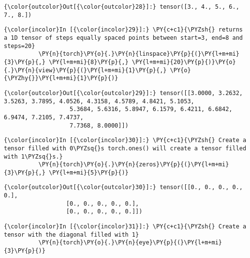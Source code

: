 \begin{Verbatim}[commandchars=\\\{\}]
{\color{outcolor}Out[{\color{outcolor}28}]:} tensor([3., 4., 5., 6., 7., 8.])
\end{Verbatim}
            
\begin{Verbatim}[commandchars=\\\{\}]
{\color{incolor}In [{\color{incolor}29}]:} \PY{c+c1}{\PYZsh{} returns a 1D tensor of steps equally spaced points between start=3, end=8 and steps=20}
          \PY{n}{torch}\PY{o}{.}\PY{n}{linspace}\PY{p}{(}\PY{l+m+mi}{3}\PY{p}{,} \PY{l+m+mi}{8}\PY{p}{,} \PY{l+m+mi}{20}\PY{p}{)}\PY{o}{.}\PY{n}{view}\PY{p}{(}\PY{l+m+mi}{1}\PY{p}{,} \PY{o}{\PYZhy{}}\PY{l+m+mi}{1}\PY{p}{)} 
\end{Verbatim}


\begin{Verbatim}[commandchars=\\\{\}]
{\color{outcolor}Out[{\color{outcolor}29}]:} tensor([[3.0000, 3.2632, 3.5263, 3.7895, 4.0526, 4.3158, 4.5789, 4.8421, 5.1053,
                   5.3684, 5.6316, 5.8947, 6.1579, 6.4211, 6.6842, 6.9474, 7.2105, 7.4737,
                   7.7368, 8.0000]])
\end{Verbatim}
            
\begin{Verbatim}[commandchars=\\\{\}]
{\color{incolor}In [{\color{incolor}30}]:} \PY{c+c1}{\PYZsh{} Create a tensor filled with 0\PYZsq{}s torch.ones() will create a tensor filled with 1\PYZsq{}s.}
          \PY{n}{torch}\PY{o}{.}\PY{n}{zeros}\PY{p}{(}\PY{l+m+mi}{3}\PY{p}{,} \PY{l+m+mi}{5}\PY{p}{)} 
\end{Verbatim}


\begin{Verbatim}[commandchars=\\\{\}]
{\color{outcolor}Out[{\color{outcolor}30}]:} tensor([[0., 0., 0., 0., 0.],
                  [0., 0., 0., 0., 0.],
                  [0., 0., 0., 0., 0.]])
\end{Verbatim}
            
\begin{Verbatim}[commandchars=\\\{\}]
{\color{incolor}In [{\color{incolor}31}]:} \PY{c+c1}{\PYZsh{} Create a tensor with the diagonal filled with 1}
          \PY{n}{torch}\PY{o}{.}\PY{n}{eye}\PY{p}{(}\PY{l+m+mi}{3}\PY{p}{)}
\end{Verbatim}


